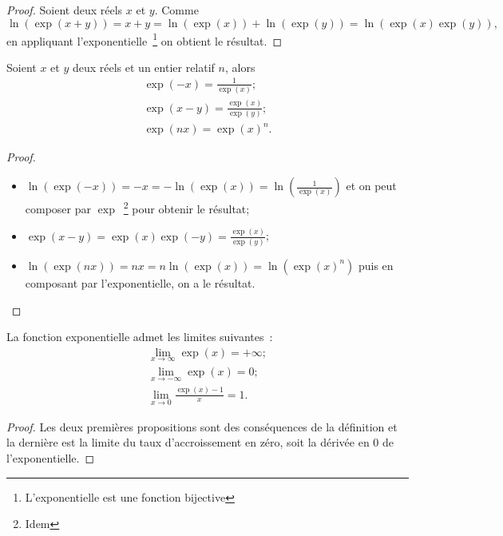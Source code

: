 \begin{proof}
  Soient deux réels \(x\) et \(y\). Comme
  \begin{equation}
    \ln(\exp(x+y))=x+y=\ln(\exp(x))+\ln(\exp(y))=\ln(\exp(x) \exp(y)),
  \end{equation}
  en appliquant l'exponentielle~\footnote{L'exponentielle est une fonction bijective} on obtient le résultat.
\end{proof}
%
\begin{prop}
  Soient \(x\) et \(y\) deux réels et un entier relatif \(n\), alors
  \begin{gather}
    \exp(-x)=\frac{1}{\exp(x)}; \\
    \exp(x-y)=\frac{\exp(x)}{\exp(y)}; \\
    \exp(nx)=\exp(x)^n.
  \end{gather}
\end{prop}
\begin{proof}
  \begin{itemize}
  \item \(\ln(\exp(-x))=-x=-\ln(\exp(x))=\ln \left(\frac{1}{\exp(x)}\right)\) et on peut composer par \(\exp\)~\footnote{Idem} pour obtenir le résultat;
  \item \(\exp(x-y)=\exp(x) \exp(-y)=\frac{\exp(x)}{\exp(y)}\);
  \item \(\ln(\exp(nx))=nx=n \ln(\exp(x))=\ln(\exp(x)^n)\) puis en composant par l'exponentielle, on a le résultat.
  \end{itemize}
\end{proof}
%
\begin{prop}
  La fonction exponentielle admet les limites suivantes~:
  \begin{gather}
    \lim\limits_{x \to \infty} \exp(x)=+\infty;\\
    \lim\limits_{x \to -\infty} \exp(x)=0;\\
    \lim\limits_{x \to 0} \frac{\exp(x)-1}{x}=1.
  \end{gather}
\end{prop}
\begin{proof}
  Les deux premières propositions sont des conséquences de la définition et la dernière est la limite du taux d'accroissement en zéro, soit la dérivée en 0 de l'exponentielle.
\end{proof}
%
